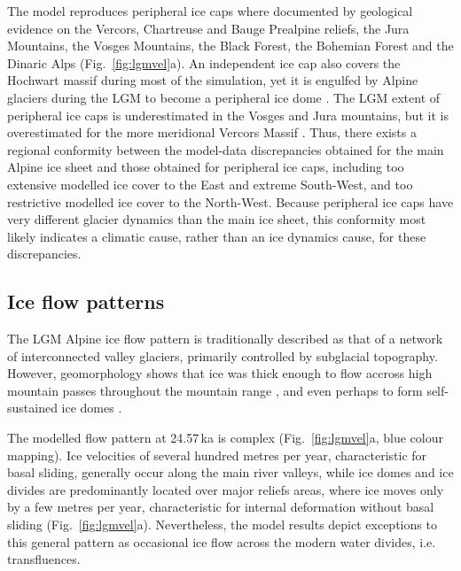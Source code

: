 \documentclass[tc, manuscript]{copernicus}
\begin{document}
    The model reproduces peripheral ice caps where documented by geological
    evidence on the Vercors, Chartreuse and Bauge Prealpine reliefs,
    the Jura Mountains, the Vosges Mountains, the Black Forest, the Bohemian
    Forest and the Dinaric Alps (Fig.~\ref{fig:lgmvel}a). An independent ice
    cap also covers the Hochwart massif during most of the simulation, yet it
    is engulfed by Alpine glaciers during the LGM to become a peripheral ice
    dome \citep[Fig.~\ref{fig:lgmvel}a; cf.][Fig.~2.5]{Husen.2011}. The LGM
    extent of peripheral ice caps is underestimated in the Vosges and Jura
    mountains, but it is overestimated for the more meridional Vercors Massif
    \citep[Fig.~\ref{fig:lgmvel}a; cf.][Figs.~4.28, 4.32, and 4.33,
    p.~322--321]{Coutterand.2010}. Thus, there exists a regional conformity
    between the model-data discrepancies obtained for the main Alpine ice sheet
    and those obtained for peripheral ice caps, including too extensive
    modelled ice cover to the East and extreme South-West, and too restrictive
    modelled ice cover to the North-West. Because peripheral ice caps have
    very different glacier dynamics than the main ice sheet, this conformity
    most likely indicates a climatic cause, rather than an ice dynamics cause,
    for these discrepancies.


\subsection{Ice flow patterns}
\label{sec:flow}

    The LGM Alpine ice flow pattern is traditionally described as that of a
    network of interconnected valley glaciers, primarily controlled by
    subglacial topography. However, geomorphology shows that ice was thick
    enough to flow accross high mountain passes throughout the mountain range
    \citep[e.g.,][]{Onde.1938, Penck.Bruckner.1909, Jackli.1962, Husen.1985,
    Husen.2011, Kelly.etal.2004, Coutterand.2010}, and even perhaps to form
    self-sustained ice domes \citep{Florineth.1998, Florineth.Schluchter.1998,
    Kelly.etal.2004, Bini.etal.2009}.

    The modelled flow pattern at 24.57\,ka is complex (Fig.~\ref{fig:lgmvel}a,
    blue colour mapping). Ice velocities of several hundred metres per year,
    characteristic for basal sliding, generally occur along the main river valleys,
    while ice domes and ice divides are predominantly located over major
    reliefs areas, where ice moves only by a few metres per year,
    characteristic for internal deformation without basal sliding
    (Fig.~\ref{fig:lgmvel}a). Nevertheless, the model results depict exceptions
    to this general pattern as occasional ice flow across the modern water
    divides, i.e. transfluences.
\end{document}
